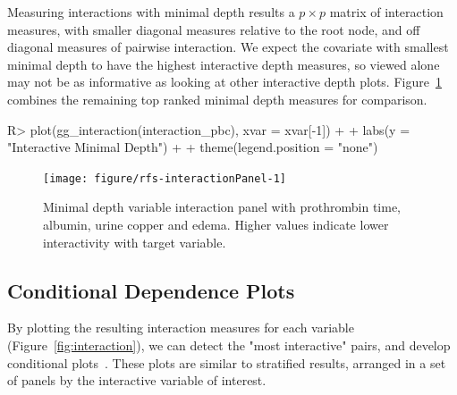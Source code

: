 \documentclass[nojss]{jss}
\begin{document}
Measuring interactions with minimal depth results a $p \times p$ matrix of interaction measures, with smaller diagonal measures relative to the root node, and off diagonal measures of pairwise interaction. We expect the covariate with smallest minimal depth to have the highest interactive depth measures, so viewed alone may not be as informative as looking at other interactive depth plots. Figure~\ref{fig:interactionPanel} combines the remaining top ranked minimal depth measures for comparison.
\begin{Schunk}
\begin{Sinput}
R> plot(gg_interaction(interaction_pbc), xvar = xvar[-1]) + 
+   labs(y = "Interactive Minimal Depth") + 
+   theme(legend.position = "none")
\end{Sinput}
\begin{figure}[!htpb]

{\centering \texttt{[image: figure/rfs-interactionPanel-1]} 

}

\caption[Minimal depth variable interaction panel with prothrombin time, albumin, urine copper and edema]{Minimal depth variable interaction panel with prothrombin time, albumin, urine copper and edema. Higher values indicate lower interactivity with target variable.\label{fig:interactionPanel}}
\end{figure}
\end{Schunk}

\subsection{Conditional Dependence Plots}

By plotting the resulting interaction measures for each variable (Figure~\ref{fig:interaction}), we can detect the "most interactive" pairs, and develop conditional plots~\cite{chambers:1992, cleveland:1993}. These plots are similar to stratified results, arranged in a set of panels by the interactive variable of interest. 
\end{document}
